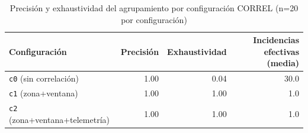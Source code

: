 \begin{table}[H]
\centering
\caption{Precisi\'on y exhaustividad del agrupamiento por configuraci\'on CORREL (n=20 por configuraci\'on)}
\label{tab:resultado-correl}
\begin{tabular}{@{}lrrr@{}}
\toprule
\textbf{Configuraci\'on} & \textbf{Precisi\'on} & \textbf{Exhaustividad} & \textbf{Incidencias efectivas (media)} \\
\midrule
\texttt{c0} (sin correlaci\'on) & 1.00 & 0.04 & 30.0 \\
\texttt{c1} (zona+ventana) & 1.00 & 1.00 & 1.0 \\
\texttt{c2} (zona+ventana+telemetr\'ia) & 1.00 & 1.00 & 1.0 \\
\bottomrule
\end{tabular}
\end{table}
